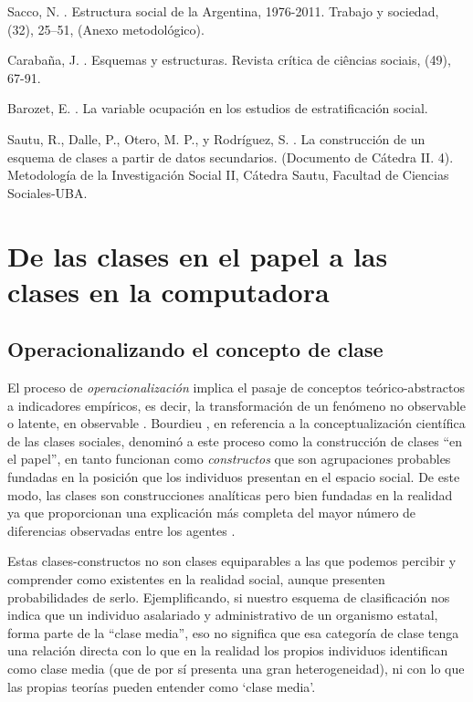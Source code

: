 \documentclass[
]{book}
\begin{document}
Sacco, N. \citeyearpar{Sacco2019}. Estructura social de la Argentina, 1976-2011. Trabajo y sociedad, (32), 25--51, (Anexo metodológico).

Carabaña, J. \citeyearpar{Carabana1997}. Esquemas y estructuras. Revista crítica de ciências sociais, (49), 67-91.

Barozet, E. \citeyearpar{Barozet2007}. La variable ocupación en los estudios de estratificación social.

Sautu, R., Dalle, P., Otero, M. P., y Rodríguez, S. \citeyearpar{Sautu.etal2007}. La construcción de un esquema de clases a partir de datos secundarios. (Documento de Cátedra II. 4). Metodología de la Investigación Social II, Cátedra Sautu, Facultad de Ciencias Sociales-UBA.

\hypertarget{computadora}{%
\section{De las clases en el papel a las clases en la computadora}\label{computadora}}

\hypertarget{operacionalizando-el-concepto-de-clase}{%
\subsection{Operacionalizando el concepto de clase}\label{operacionalizando-el-concepto-de-clase}}

El proceso de \emph{operacionalización} implica el pasaje de conceptos teórico-abstractos a indicadores empíricos, es decir, la transformación de un fenómeno no observable o latente, en observable \citep{DAncona1996}. Bourdieu \citeyearpar{Bourdieu1990}, en referencia a la conceptualización científica de las clases sociales, denominó a este proceso como la construcción de clases ``en el papel'', en tanto funcionan como \emph{constructos} que son agrupaciones probables fundadas en la posición que los individuos presentan en el espacio social. De este modo, las clases son construcciones analíticas pero bien fundadas en la realidad ya que proporcionan una explicación más completa del mayor número de diferencias observadas entre los agentes \citep[pp.~130]{Bourdieu1990}.

Estas clases-constructos no son clases equiparables a las que podemos percibir y comprender como existentes en la realidad social, aunque presenten probabilidades de serlo. Ejemplificando, si nuestro esquema de clasificación nos indica que un individuo asalariado y administrativo de un organismo estatal, forma parte de la ``clase media'', eso no significa que esa categoría de clase tenga una relación directa con lo que en la realidad los propios individuos identifican como clase media (que de por sí presenta una gran heterogeneidad), ni con lo que las propias teorías pueden entender como `clase media'.
\end{document}
